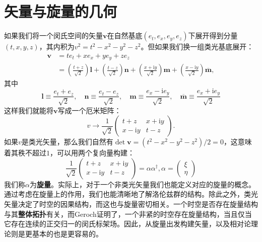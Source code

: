 \chapter{矢量与旋量的几何}

如果我们将一个闵氏空间的矢量$\boldsymbol{v}$在自然基底$(e_{t} ,e_{x} ,e_{y} ,e_{z} )$下展开得到分量$( t,x,y,z)$，其内积为$v^{2} =t^{2} -x^{2} -y^{2} -z^{2}$。但如果我们换一组类光基底展开：
\begin{equation*}
	\begin{aligned}
		\boldsymbol{v} & =te_{t} +xe_{x} +ye_{y} +ze_{z}\\
		& =\left(\frac{t+z}{\sqrt{2}}\right)\boldsymbol{l} +\left(\frac{t-z}{\sqrt{2}}\right)\boldsymbol{n} +\left(\frac{x+\mathrm{i} y}{\sqrt{2}}\right)\boldsymbol{m} +\left(\frac{x-\mathrm{i} y}{\sqrt{2}}\right)\overline{\boldsymbol{m}} ,
	\end{aligned}
\end{equation*}
其中
\begin{equation*}
	\boldsymbol{l} \equiv \frac{e_{t} +e_{z}}{\sqrt{2}} ,\quad \boldsymbol{n} \equiv \frac{e_{t} -e_{z}}{\sqrt{2}} ,\quad \boldsymbol{m} \equiv \frac{e_{x} -\mathrm{i} e_{y}}{\sqrt{2}} ,\quad \overline{\boldsymbol{m}} \equiv \frac{e_{x} +\mathrm{i} e_{y}}{\sqrt{2}}
\end{equation*}
这样我们就能将$\boldsymbol{v}$写成一个厄米矩阵：
\begin{equation*}
	v\rightarrow \frac{1}{\sqrt{2}}\begin{pmatrix}
		t+z & x+\mathrm{i} y\\
		x-\mathrm{i} y & t-z
	\end{pmatrix} .
\end{equation*}
如果$v$是类光矢量，那么我们自然有$\det\boldsymbol{v} =(t^{2} -x^{2} -y^{2} -z^{2} )/2=0$，这意味着其秩不超过$1$，可以用两个复向量构建：
\begin{equation*}
	\frac{1}{\sqrt{2}}\begin{pmatrix}
		t+z & x+\mathrm{i} y\\
		x-\mathrm{i} y & t-z
	\end{pmatrix} =\alpha \alpha ^{\dagger } ,\alpha =\begin{pmatrix}
		\xi \\
		\eta 
	\end{pmatrix}
\end{equation*}
我们称$\alpha $为\textbf{旋量}。实际上，对于一个非类光矢量我们也能定义对应的旋量的概念。通过考虑在旋量上的作用，我们也能清晰地了解洛伦兹群的结构。除此之外，类光矢量决定了时空的因果结构，而这也与旋量密切相关。一个时空是否存在旋量结构与其\textbf{整体拓扑}有关，而Geroch证明了\parencite{geroch1968spinor}，一个非紧的时空存在旋量结构，当且仅当它存在连续的正交归一的闵氏标架场。因此，从旋量出发构建矢量，以及相对论理论则是更基本的也是更容易的。

